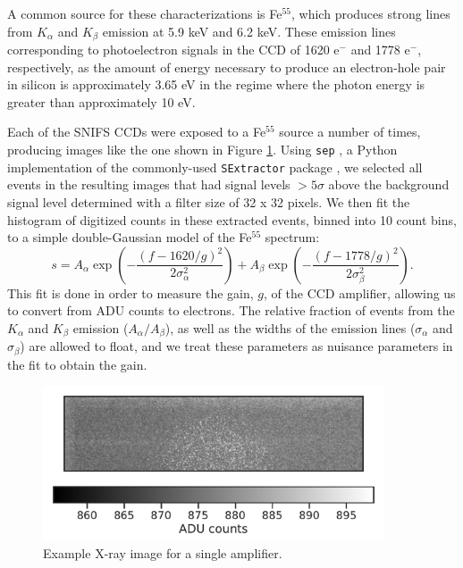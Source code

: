 A common source for these characterizations is Fe$^{55}$, which produces strong lines from $K_\alpha$ and $K_\beta$ emission at 5.9 keV and 6.2 keV. These emission lines corresponding to photoelectron signals in the CCD of 1620 $\textrm{e}^-$ and 1778 $\textrm{e}^-$, respectively, as the amount of energy necessary to produce an electron-hole pair in silicon is approximately 3.65 eV in the regime where the photon energy is greater than approximately 10 eV.

Each of the SNIFS CCDs were exposed to a Fe$^{55}$ source a number of times, producing images like the one shown in Figure \ref{fig:example_xray_image}. Using \verb|sep| \citep{barbary_sep_2015}, a Python implementation of the commonly-used \verb|SExtractor| package \citep{bertin_sextractor_1996}, we selected all events in the resulting images that had signal levels $>5\sigma$ above the background signal level determined with a filter size of 32 x 32 pixels. We then fit the histogram of digitized counts in these extracted events, binned into 10 count bins, to a simple double-Gaussian model of the Fe$^{55}$ spectrum:
\begin{equation}
    s = A_\alpha \exp\left(-\frac{(f-1620/g)^2}{2\sigma_\alpha^2}\right) + A_\beta \exp\left(-\frac{(f-1778/g)^2}{2\sigma_\beta^2}\right).
\end{equation}
This fit is done in order to measure the gain, $g$, of the CCD amplifier, allowing us to convert from ADU counts to electrons. The relative fraction of events from the $K_\alpha$ and $K_\beta$ emission ($A_\alpha/A_\beta$), as well as the widths of the emission lines ($\sigma_\alpha$ and $\sigma_\beta$) are allowed to float, and we treat these parameters as nuisance parameters in the fit to obtain the gain.

\begin{figure}
    \centering
    \includegraphics[width=0.9\textwidth]{figures/cte/example_xray_image.pdf}
    \caption{Example X-ray image for a single amplifier.}
    \label{fig:example_xray_image}
\end{figure}

